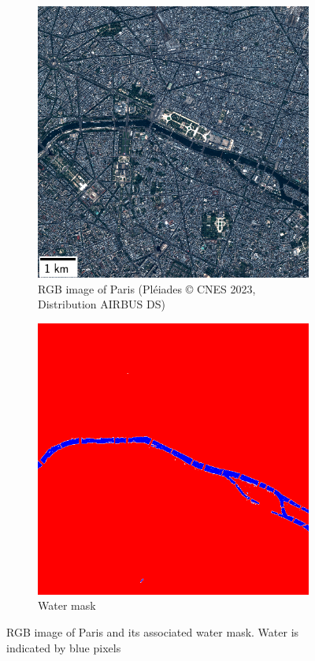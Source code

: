 \begin{figure}
    \centering
    \begin{subfigure}[t]{0.48\linewidth}
        \flushleft
        \includegraphics[width=\linewidth]{Images/Chap_6/miniature_Paris.png}
        \caption{RGB image of Paris (Pléiades © CNES 2023, Distribution AIRBUS DS)}
        \label{fig:paris_watermask_1}
    \end{subfigure}\hfill
    \begin{subfigure}[t]{0.48\linewidth}
        \flushright
        \includegraphics[width=\linewidth]{Images/Chap_6/watermask_Paris.png}
        \caption{Water mask}
        \label{fig:paris_watermask_2}
    \end{subfigure}
    \caption{RGB image of Paris and its associated water mask. Water is indicated by blue pixels}
    \label{fig:paris_watermask}
\end{figure}

